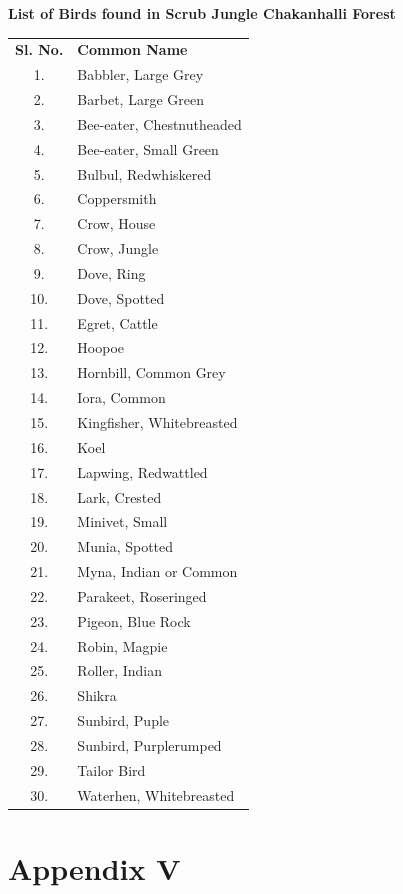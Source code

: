 \begin{center}
\smallskip
\textbf{List of Birds found in Scrub Jungle Chakanhalli Forest}
\end{center}
{\renewcommand{\arraystretch}{1.1}
\begin{longtable}{cl}
\textbf{Sl. No.} & \textbf{Common Name}\\
1. &Babbler, Large Grey \\
2. &Barbet, Large Green \\
3. &Bee-eater, Chestnutheaded \\
4. &Bee-eater, Small Green \\
5. &Bulbul, Redwhiskered \\
6. &Coppersmith \\
7. &Crow, House \\
8. &Crow, Jungle \\
9. &Dove, Ring \\
10.& Dove, Spotted \\
11.& Egret, Cattle \\
12.& Hoopoe \\
13. &Hornbill, Common Grey \\
14. &Iora, Common \\
15. &Kingfisher, Whitebreasted \\
16. &Koel \\
17. &Lapwing, Redwattled \\
18. &Lark, Crested \\
19. &Minivet, Small \\
20. &Munia, Spotted \\
21. &Myna, Indian or Common \\
22. &Parakeet, Roseringed \\
23. &Pigeon, Blue Rock \\
24. &Robin, Magpie \\
25. &Roller, Indian \\
26. &Shikra \\
27. &Sunbird, Puple \\
28. &Sunbird, Purplerumped \\
29. &Tailor Bird \\
30. &Waterhen, Whitebreasted 
\end{longtable}}

\newpage

\chapter*{Appendix V}

